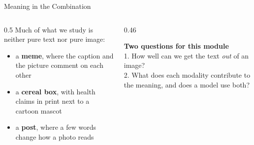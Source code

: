 \newcommand{\coursemodule}{Module 11}





\begin{frame}{Meaning in the Combination}
\begin{columns}[T]
\begin{column}{0.5\textwidth}
Much of what we study is neither pure text nor pure image:

\begin{itemize}
\item a \textbf{meme}, where the caption and the picture comment on each other
\item a \textbf{cereal box}, with health claims in print next to a cartoon mascot
\item a \textbf{post}, where a few words change how a photo reads
\end{itemize}
\end{column}
\begin{column}{0.46\textwidth}
\begin{greenbox}
\textbf{Two questions for this module}\\[2pt]
1. How well can we get the text \emph{out} of an image?\\[2pt]
2. What does each modality contribute to the meaning, and does a model use both?
\end{greenbox}
\end{column}
\end{columns}
\end{frame}

